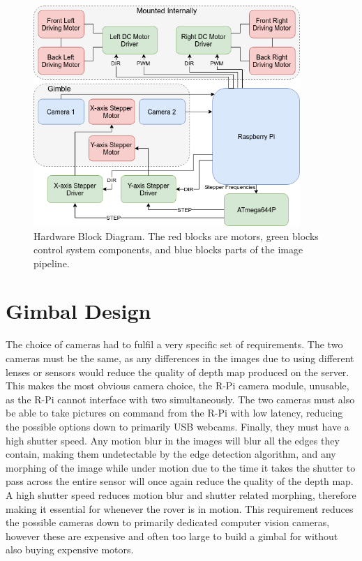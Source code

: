 \begin{figure}[H]
    \begin{center}
      \includegraphics[width=0.9\textwidth]{Figures/hardware.png}
      \caption[Hardware Block Diagram]{Hardware Block Diagram. The red blocks are motors, green blocks control system components, and blue blocks parts of the image pipeline.}
      \label{fig:hardware}
    \end{center}
\end{figure}

\section{Gimbal Design}

The choice of cameras had to fulfil a very specific set of requirements. The two cameras must be the same, as any differences in the images due to using different lenses or sensors would reduce the quality of depth map produced on the server. This makes the most obvious camera choice, the R-Pi camera module, unusable, as the R-Pi cannot interface with two simultaneously. The two cameras must also be able to take pictures on command from the R-Pi with low latency, reducing the possible options down to primarily USB webcams. Finally, they must have a high shutter speed. Any motion blur in the images will blur all the edges they contain, making them undetectable by the edge detection algorithm, and any morphing of the image while under motion due to the time it takes the shutter to pass across the entire sensor will once again reduce the quality of the depth map. A high shutter speed reduces motion blur and shutter related morphing, therefore making it essential for whenever the rover is in motion. This requirement reduces the possible cameras down to primarily dedicated computer vision cameras, however these are expensive and often too large to build a gimbal for without also buying expensive motors.

